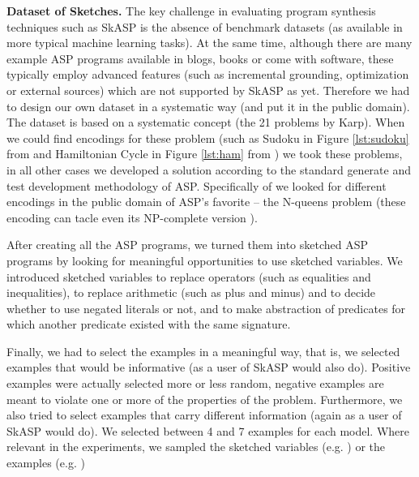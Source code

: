 \textbf{Dataset of Sketches.}
The key challenge in evaluating program synthesis techniques such as SkASP is the absence of 
benchmark datasets (as available in more typical machine learning tasks). At the same time,
although there are many example ASP programs available in blogs, books or come with software,
these typically employ advanced features (such as incremental grounding, optimization or external sources) which are not supported by SkASP as yet.
Therefore we had to design our own dataset in a systematic way (and put it in the public domain).
The dataset is based on a systematic concept (the 21 problems by Karp). When 
we could find encodings for these problem (such as Sudoku in Figure \ref{lst:sudoku} from \parencite{asp_tutorial_sudoku} and Hamiltonian Cycle in Figure \ref{lst:ham} from \parencite{ASPbook}) we took these problems, in all other cases we developed a solution according to the standard generate and test development methodology of ASP.
Specifically of \qfive we looked for different encodings in the public domain of ASP’s favorite -- the N-queens problem (these encoding can tacle even its NP-complete version \parencite{complexity_nqueens}).

After creating all the ASP programs, we turned them into sketched ASP programs by looking for meaningful opportunities to use 
sketched variables. We introduced sketched variables to replace operators (such as equalities and inequalities), to replace arithmetic (such as plus and minus)
and to decide whether to use negated literals or not, and to make abstraction of predicates for which another predicate existed with the same signature.

Finally, we had to select the examples in a meaningful way, that is, we selected examples that would be informative
(as a user of SkASP would also do). Positive examples were actually selected more or less random,
negative examples are meant to violate one or more of the properties of the problem. Furthermore, we also 
tried to select examples that carry different information (again as a user of SkASP would do). We selected between 4 and 7 examples for each model. Where relevant in the experiments, we sampled the sketched variables (e.g. \qfive) or the examples (e.g. \qthree)



